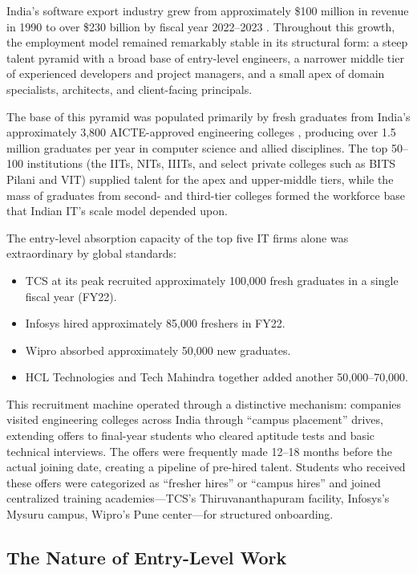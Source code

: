 \documentclass[conference]{IEEEtran}
\begin{document}
India's software export industry grew from approximately \$100 million in revenue in 1990 to over \$230 billion by fiscal year 2022--2023 \cite{nasscom2024report}. Throughout this growth, the employment model remained remarkably stable in its structural form: a steep talent pyramid with a broad base of entry-level engineers, a narrower middle tier of experienced developers and project managers, and a small apex of domain specialists, architects, and client-facing principals.

The base of this pyramid was populated primarily by fresh graduates from India's approximately 3,800 AICTE-approved engineering colleges \cite{aicte2023annual}, producing over 1.5 million graduates per year in computer science and allied disciplines. The top 50--100 institutions (the IITs, NITs, IIITs, and select private colleges such as BITS Pilani and VIT) supplied talent for the apex and upper-middle tiers, while the mass of graduates from second- and third-tier colleges formed the workforce base that Indian IT's scale model depended upon.

The entry-level absorption capacity of the top five IT firms alone was extraordinary by global standards:

\begin{itemize}
    \item TCS at its peak recruited approximately 100,000 fresh graduates in a single fiscal year (FY22).
    \item Infosys hired approximately 85,000 freshers in FY22.
    \item Wipro absorbed approximately 50,000 new graduates.
    \item HCL Technologies and Tech Mahindra together added another 50,000--70,000.
\end{itemize}

This recruitment machine operated through a distinctive mechanism: companies visited engineering colleges across India through ``campus placement'' drives, extending offers to final-year students who cleared aptitude tests and basic technical interviews. The offers were frequently made 12--18 months before the actual joining date, creating a pipeline of pre-hired talent. Students who received these offers were categorized as ``fresher hires'' or ``campus hires'' and joined centralized training academies---TCS's Thiruvananthapuram facility, Infosys's Mysuru campus, Wipro's Pune center---for structured onboarding.

\subsection{The Nature of Entry-Level Work}
\end{document}
